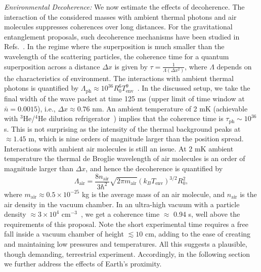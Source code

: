 \documentclass[aps,prd,reprint,superscriptaddress,nofootinbib,floatfix]{revtex4-2}
\begin{document}
\emph{Environmental Decoherence:}
We now estimate the effects of decoherence. The interaction of the considered masses with ambient thermal photons and air molecules suppresses coherences over long distances. For the gravitational entanglement proposals, such decoherence mechanisms have been studied in Refs.~\cite{QuantGrav-Bose2017,QuantGrav-Vedral2017,QuantGrav-Tanjung2020,QuantGrav-Decoherence-Rijavec2021,QuantGrav-Animesh2021}. 
In the regime where the superposition is much smaller than the
wavelength of the scattering particles,
the coherence time for a quantum superposition across a distance $\Delta x$ is given by 
$\tau = \frac{1}{\Lambda (\Delta x^2)}$, 
where $\Lambda$ depends on the characteristics of environment. The interactions with ambient thermal photons is quantified by $\Lambda_{\text{ph}} \approx 10^{36} R_0^6 T_{\text{env}}^9$~\cite{book-Decoherence-Maximilian}.
In the discussed setup, we take the final width of the wave packet at time 125 ms (upper limit of time window at $\bar n = 0.0015$), i.e., $\Delta x \approx 0.76$ nm.
An ambient temperature of 2 mK (achievable with ${}^3$He/${}^4$He dilution refrigerator~\cite{Dilution-Referigerator}) implies that the coherence time is $\tau_\text{ph} \sim 10^{36}$ s. This is not surprising as the intensity of the thermal background peaks at $\approx 1.45$ m, which is nine orders of magnitude larger than the position spread.
Interactions with ambient air molecules is still an issue. 
At 2 mK ambient temperature the thermal de Broglie wavelength of air molecules is an order of magnitude larger than $\Delta x$, and hence the decoherence is quantified by~\cite{book-Decoherence-Maximilian}
\begin{equation}
\Lambda_\text{air} = \frac{8 n_\text{air}}{3\hbar^2}  \sqrt{2\pi m_\text{air}} (k_B T_\text{env})^{3/2}  R_0^2,
\end{equation}
where $m_\text{air} \approx 0.5 \times 10^{-25}$ kg is the average mass of an air molecule, and $n_\text{air}$ is the air density in the vacuum chamber.
In an ultra-high vacuum with a particle density $\approx 3 \times 10^{4}$ cm$^{-3}$~\cite{url-UHV}, we get a coherence time $\approx$ 0.94 s, well above the requirements of this proposal. Note the short experimental time requires a free fall inside a vacuum chamber of height $\lesssim 10$ cm, adding to the ease of creating and maintaining low pressures and temperatures. All this suggests a plausible, though demanding, terrestrial experiment. Accordingly, in the following section we further address the effects of Earth's proximity.
\end{document}
